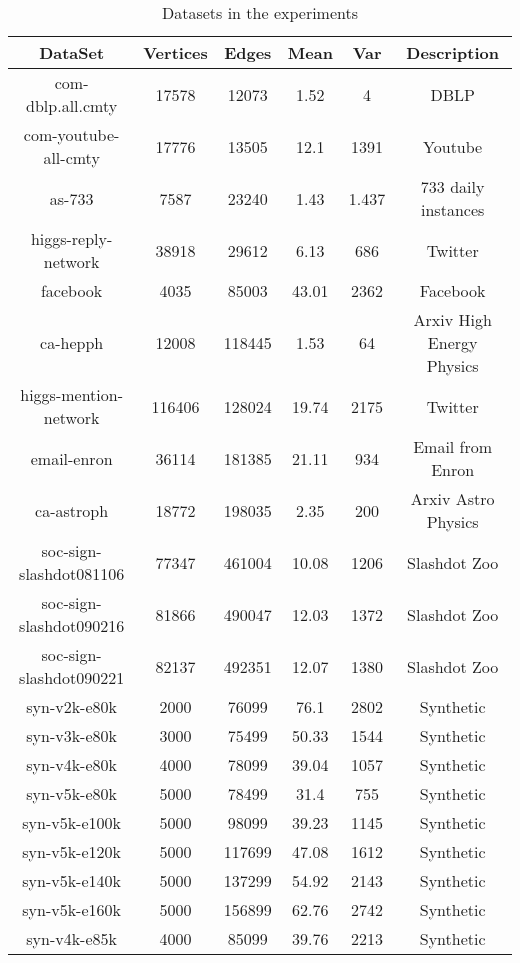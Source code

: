 \documentclass{sig-alternate-2013}
\begin{document}
\begin{table*}[!hpp]
\centering
\caption{Datasets in the experiments}
\begin{tabular}{cccccc}
\hline
DataSet                 & Vertices  & Edges   &Mean    &Var     & Description\\
\hline
com-dblp.all.cmty       & 17578     & 12073   &1.52     &4      & DBLP\\
com-youtube-all-cmty    & 17776     & 13505   &12.1     &1391   & Youtube\\
as-733                  & 7587      & 23240   &1.43     &1.437  & 733 daily instances\\
higgs-reply-network     & 38918     & 29612   &6.13     &686    & Twitter\\
facebook                & 4035      & 85003   &43.01    &2362   & Facebook \\
ca-hepph                & 12008     & 118445  &1.53     &64     & Arxiv High Energy Physics\\
higgs-mention-network   & 116406    & 128024  &19.74    &2175   & Twitter\\
email-enron             & 36114     & 181385  &21.11    &934    & Email from Enron\\
ca-astroph              & 18772     & 198035  &2.35     &200    & Arxiv Astro Physics\\
soc-sign-slashdot081106 & 77347     & 461004  &10.08    &1206   & Slashdot Zoo \\
soc-sign-slashdot090216 & 81866     & 490047  &12.03    &1372   & Slashdot Zoo\\
soc-sign-slashdot090221 & 82137     & 492351  &12.07    &1380   & Slashdot Zoo\\
\hline
syn-v2k-e80k            & 2000      & 76099   &76.1  &2802   & Synthetic\\
syn-v3k-e80k            & 3000      & 75499   &50.33 &1544   & Synthetic\\
syn-v4k-e80k            & 4000      & 78099   &39.04 &1057   & Synthetic\\
syn-v5k-e80k            & 5000      & 78499   &31.4  &755    & Synthetic\\
syn-v5k-e100k           & 5000      & 98099   &39.23 &1145   & Synthetic\\
syn-v5k-e120k           & 5000      & 117699  &47.08 &1612   & Synthetic\\
syn-v5k-e140k           & 5000      & 137299  &54.92 &2143   & Synthetic\\
syn-v5k-e160k           & 5000      & 156899  &62.76 &2742   & Synthetic\\
syn-v4k-e85k            & 4000      & 85099   &39.76 &2213   & Synthetic\\
\hline
\end{tabular}
\end{table*}
\end{document}
